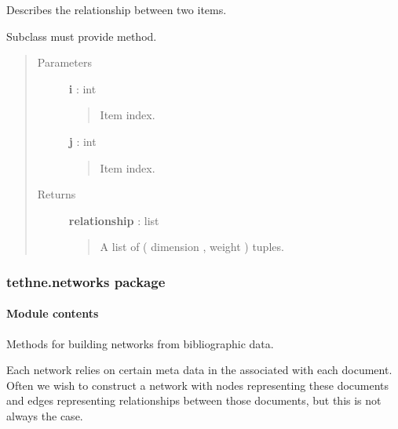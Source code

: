 \documentclass[letterpaper,10pt,english]{sphinxmanual}
\begin{document}
\begin{fulllineitems}

\begin{fulllineitems}
\label{tethne.model.basemodel:tethne.model.basemodel.BaseModel.item_relationship}
Describes the relationship between two items.

Subclass must provide  method.
\begin{quote}\begin{description}
\item[{Parameters}] \leavevmode
\textbf{i} : int
\begin{quote}

Item index.
\end{quote}

\textbf{j} : int
\begin{quote}

Item index.
\end{quote}

\item[{Returns}] \leavevmode
\textbf{relationship} : list
\begin{quote}

A list of ( dimension ,  weight ) tuples.
\end{quote}

\end{description}\end{quote}

\end{fulllineitems}


\end{fulllineitems}



\subsubsection{tethne.networks package}
\label{tethne.networks::doc}\label{tethne.networks:tethne-networks-package}

\paragraph{Module contents}
\label{tethne.networks:module-contents}\label{tethne.networks:module-tethne.networks}
Methods for building networks from bibliographic data.

Each network relies on certain meta data in the {\hyperref[tethne.classes.paper:tethne.classes.paper.Paper]{}} associated with
each document. Often we wish to construct a network with nodes representing
these documents and edges representing relationships between those documents,
but this is not always the case.
\end{document}
